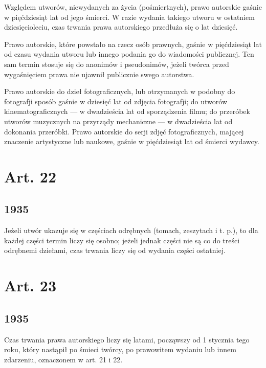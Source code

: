 \documentclass[withmarginpar]{book}
\begin{document}
Względem utworów, niewydanych za życia (pośmiertnych), prawo autorskie
gaśnie w pięćdziesiąt lat od jego śmierci. W razie wydania takiego
utworu w ostatniem dziesięcioleciu, czas trwania prawa autorskiego
przedłuża się o lat dziesięć.

Prawo autorskie, które powstało na rzecz osób prawnych, gaśnie w
pięćdziesiąt lat od czasu wydania utworu lub innego podania go do
wiadomości publicznej. Ten sam termin stosuje się do anonimów i
pseudonimów, jeżeli twórca przed wygaśnięciem prawa nie ujawnił
publicznie swego autorstwa.

Prawo autorskie do dzieł fotograficznych, lub otrzymanych w podobny do
fotografji sposób gaśnie w dziesięć lat od zdjęcia fotografji; do
utworów kinematograficznych — w dwadzieścia lat od sporządzenia filmu;
do przeróbek utworów muzycznych na przyrządy mechaniczne — w
dwadzieścia lat od dokonania przeróbki. Prawo autorskie do serji zdjęć
fotograficznych, mającej znaczenie artystyczne lub naukowe, gaśnie w
pięćdziesiąt lat od śmierci wydawcy.

\section{Art. 22}
\label{sec:art.-22}
\subsection{1935}
\label{sec:art.-22-1}

Jeżeli utwór ukazuje się w częściach odrębnych (tomach, zeszytach i
t. p.), to dla każdej części termin liczy się osobno; jeżeli jednak
części nie są co do treści odrębnemi dziełami, czas trwania liczy się
od wydania części ostatniej.

\section{Art. 23}
\label{sec:art.-23}
\subsection{1935}
\label{sec:art.-23-1}

Czas trwania prawa autorskiego liczy się latami, począwszy od 1
stycznia tego roku, który nastąpił po śmieci twórcy, po prawowitem
wydaniu lub innem zdarzeniu, oznaczonem w art. 21 i 22.
\end{document}
